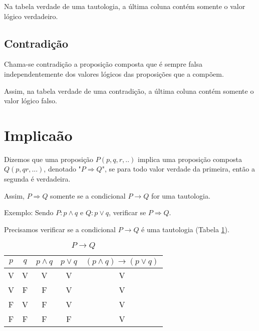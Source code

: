 Na tabela verdade de uma tautologia, a última coluna contém somente o valor lógico verdadeiro.

\subsection{Contradição}
\begin{definicao}[Contradição] Chama-se contradição a proposição composta que é sempre falsa independentemente dos valores lógicos das proposições que a comp{\~o}em.\end{definicao}

Assim, na tabela verdade de uma contradição, a última coluna contém somente o valor lógico falso.

\section{Implicaão}
\begin{definicao}[Implicaão] Dizemos que uma proposição $P(p,q,r,..)$ implica uma proposição composta $Q(p,q r,...)$, denotado "$P\Rightarrow Q$", se para todo valor verdade da primeira, então a segunda é verdadeira.\end{definicao}

Assim, $P\Rightarrow Q$ somente se a condicional $P\rightarrow Q$ for uma tautologia.

Exemplo: Sendo $P:p\wedge q$ e $Q:p\vee q$, verificar se $P\Rightarrow Q$.

Precisamos verificar se a condicional $P\rightarrow Q$ é uma tautologia (Tabela \ref{3}).
\begin{table}[h]
   \centering
   \setlength{\arrayrulewidth}{0,5\arrayrulewidth}
   \caption{\it $P\rightarrow Q$}
   \begin{tabular}{|c|c|c|c|c|}
      \hline
      $p$ & $q$ & $p\wedge q$ & $p\vee q$ & $(p\wedge q)\rightarrow(p\vee q)$ \\
     \hline
      V & V & V & V & V \\
      \hline
      V & F & F & V & V \\
      \hline
      F & V & F & V & V \\
      \hline
      F & F & F & F & V \\
      \hline
   \end{tabular}
\label{3}
\end{table}

